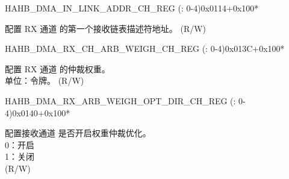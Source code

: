 \begin{register}{H}{AHB\_DMA\_IN\_LINK\_ADDR\_CH\_REG (: 0-4)}{0x0114+0x100*}\label{regdesc:AHBDMAINLINKADDRCHNREG}
%
\regnewline%
\begin{regdesc}\begin{reglist}
\label{fielddesc:AHBDMAINLINKADDRCHN}\item [AHB\_DMA\_INLINK\_ADDR\_CH\regindex{n}] 配置 RX 通道  的第一个接收链表描述符地址。 (R/W)
\end{reglist}\end{regdesc}
\end{register}


\begin{register}{H}{AHB\_DMA\_RX\_CH\_ARB\_WEIGH\_CH\_REG (: 0-4)}{0x013C+0x100*}\label{regdesc:AHBDMARXCHARBWEIGHCHNREG}
%
%
\regnewline%
\begin{regdesc}\begin{reglist}
\label{fielddesc:AHBDMARXCHARBWEIGHCHN}\item [AHB\_DMA\_RX\_CH\_ARB\_WEIGH\_CH\regindex{n}] 配置 RX 通道  的仲裁权重。\\单位：令牌。 (R/W)
\end{reglist}\end{regdesc}
\end{register}


\begin{register}{H}{AHB\_DMA\_RX\_ARB\_WEIGH\_OPT\_DIR\_CH\_REG (: 0-4)}{0x0140+0x100*}\label{regdesc:AHBDMARXARBWEIGHOPTDIRCHNREG}
%
%
\regnewline%
\begin{regdesc}\begin{reglist}
\label{fielddesc:AHBDMARXARBWEIGHOPTDIRCHN}\item [AHB\_DMA\_RX\_ARB\_WEIGH\_OPT\_DIR\_CH\regindex{n}] 配置接收通道  是否开启权重仲裁优化。\\
0：开启\\
1：关闭\\ (R/W)
\end{reglist}\end{regdesc}
\end{register}


